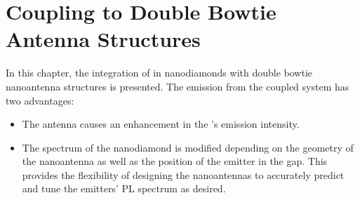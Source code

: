 

\section[Antennas]{Coupling \Nds to Double Bowtie Antenna Structures} \label{sec::coupling_antennas}

	In this chapter, the integration of \sivs in nanodiamonds with double bowtie nanoantenna structures is presented.
	The emission from the coupled system has two advantages:
	\begin{itemize}
		\item The antenna causes an enhancement in the \siv{}'s \pl emission intensity.
		\item The \pl spectrum of the nanodiamond is modified depending on the geometry of the nanoantenna as well as the position of the emitter in the gap. This provides the flexibility of designing the nanoantennas to accurately predict and tune the emitters' PL spectrum as desired.
	\end{itemize}
	
	

